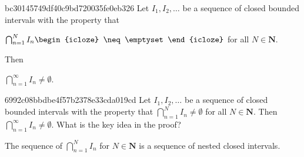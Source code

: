 \begin{note}{bc30145749df40c9bd720035fe0eb326}
    Let \({ I_1, I_2, \ldots }\) be a sequence of closed bounded intervals with the property that
    \begin{center}
        \({ \bigcap_{n = 1}^{N} I_n \begin{icloze}{2}\neq \emptyset\end{icloze} }\) for all \({ N \in \mathbf{N} }\).
    \end{center}
    Then \begin{icloze}{1}\({ \bigcap_{n = 1}^{\infty} I_n \neq \emptyset }\).\end{icloze}
\end{note}

\begin{note}{6992c08bbdbe4f57b2378e33cda019cd}
    Let \({ I_1, I_2, \ldots }\) be a sequence of closed bounded intervals with the property that \({ \bigcap_{n = 1}^{N} I_n \neq \emptyset }\) for all \({ N \in \mathbf{N} }\).
    Then \({ \bigcap_{n = 1}^{\infty} I_n \neq \emptyset }\).
    What is the key idea in the proof?

    \begin{cloze}{1}
        The sequence of \({ \bigcap_{n = 1}^{N} I_n }\) for \({ N \in \mathbf{N} }\) is a sequence of nested closed intervals.
    \end{cloze}
\end{note}


